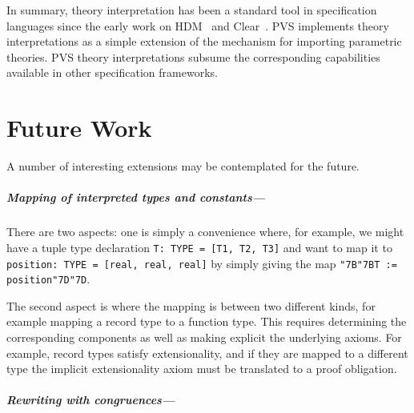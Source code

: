 \documentclass[11pt,twoside,openright,titlepage]{cslreport}
\def\mapb{\char"7B\char"7B}
\def\mape{\char"7D\char"7D}
\begin{document}
In summary, theory interpretation has been a standard tool in
specification languages since the early work on HDM~\cite{HDM:Handbook}
and Clear~\cite{BURSTALL&GOGUEN}.  PVS implements theory interpretations
as a simple extension of the mechanism for importing parametric theories.
PVS theory interpretations subsume the corresponding capabilities
available in other specification frameworks.


\chapter{Future Work}

A number of interesting extensions may be contemplated for
the future.

\paragraph{Mapping of interpreted types and constants---}

There are two aspects: one is simply a convenience where, for
example, we might have a tuple type declaration \texttt{T: TYPE = [T1, T2,
T3]} and want to map it to \texttt{position: TYPE = [real, real, real]} by
simply giving the map \texttt{\mapb{}T := position\mape{}}.

The second aspect is where the mapping is between two different kinds, for
example mapping a record type to a function type.  This requires
determining the corresponding components as well as making explicit the
underlying axioms.  For example, record types satisfy extensionality, and
if they are mapped to a different type the implicit extensionality axiom
must be translated to a proof obligation.

\paragraph{Rewriting with congruences---}
\end{document}
